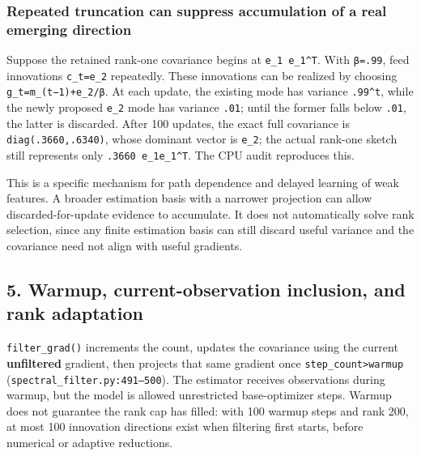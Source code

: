 \documentclass[
  british,
  10pt,
  a4paper,
]{article}
\begin{document}
\subsubsection{Repeated truncation can suppress accumulation of a real
emerging
direction}\label{mathematical-audit--repeated-truncation-can-suppress-accumulation-of-a-real-emerging-direction}

Suppose the retained rank-one covariance begins at
\texttt{e\_1\ e\_1\^{}T}. With \texttt{β=.99}, feed innovations
\texttt{c\_t=e\_2} repeatedly.\allowbreak{} These innovations can be
realized by choosing
\texttt{g\_\allowbreak{}t=\allowbreak{}m\_\allowbreak{}(t−1)+e\_\allowbreak{}2/\allowbreak{}β}.
At each update, the existing mode has variance \texttt{.99\^{}t}, while
the newly proposed \texttt{e\_2} mode has variance \texttt{.01}; until
the former falls below \texttt{.01}, the latter is discarded. After 100
updates, the exact full covariance is
\texttt{diag(.\allowbreak{}3660,\allowbreak{}.\allowbreak{}6340)}, whose
dominant vector is \texttt{e\_2}; the actual rank-one sketch still
represents only
\texttt{.\allowbreak{}3660 \allowbreak{}e\_\allowbreak{}1e\_\allowbreak{}1\textasciicircum{}T}.
The CPU audit reproduces this.

This is a specific mechanism for path dependence and delayed learning of
weak features. A broader estimation basis with a narrower projection can
allow discarded-\allowbreak{}for-\allowbreak{}update evidence to
accumulate.\allowbreak{} It does not automatically solve rank selection,
since any finite estimation basis can still discard useful variance and
the covariance need not align with useful gradients.

\subsection{\texorpdfstring{5. Warmup, current-\allowbreak{}observation
inclusion, and rank
adaptation}{5. Warmup,  inclusion, and rank adaptation}}\label{mathematical-audit--warmup-current-observation-inclusion-and-rank-adaptation}

\texttt{filter\_\allowbreak{}grad()} increments the count, updates the
covariance using the current \textbf{unfiltered} gradient, then projects
that same gradient once
\texttt{step\_\allowbreak{}count>warmup\allowbreak{}}
(\texttt{spectral\_\allowbreak{}filter.\allowbreak{}py:\allowbreak{}491–500}).
The estimator receives observations during warmup, but the model is
allowed unrestricted base-\allowbreak{}optimizer steps. Warmup does not
guarantee the rank cap has filled: with 100 warmup steps and rank 200,
at most 100 innovation directions exist when filtering first starts,
before numerical or adaptive reductions.\allowbreak{}
\end{document}
